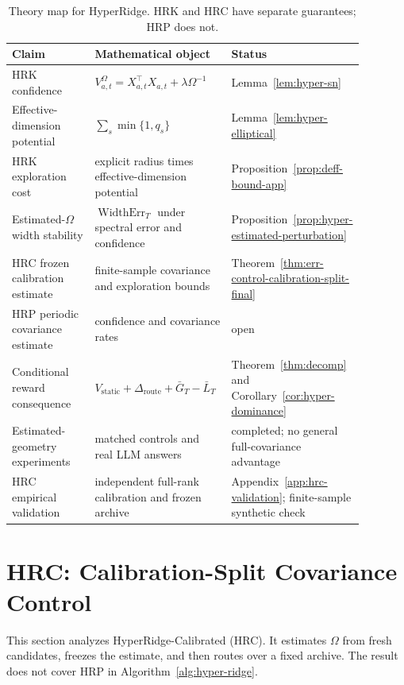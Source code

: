 \documentclass{article} %
\begin{document}
\begin{table}[h]
\centering
\small
\caption{Theory map for HyperRidge. HRK and HRC have separate guarantees;
HRP does not.}
\label{tab:hyper-theory-map}
\begin{tabular}{
p{0.24\linewidth}
p{0.39\linewidth}
p{0.25\linewidth}}
\toprule
Claim & Mathematical object & Status \\
\midrule
HRK confidence & \(V_{a,t}^{\Omega}=X_{a,t}^{\top}X_{a,t}+\lambda\Omega^{-1}\) & Lemma~\ref{lem:hyper-sn} \\
Effective-dimension potential & \(\sum_s \min\{1,q_s\}\) & Lemma~\ref{lem:hyper-elliptical} \\
HRK exploration cost & explicit radius times effective-dimension potential & Proposition~\ref{prop:deff-bound-app} \\
Estimated-\(\Omega\) width stability & \(\operatorname{WidthErr}_T\) under spectral error and confidence & Proposition~\ref{prop:hyper-estimated-perturbation} \\
HRC frozen calibration estimate & finite-sample covariance and exploration bounds & Theorem~\ref{thm:err-control-calibration-split-final} \\
HRP periodic covariance estimate & confidence and covariance rates & open \\
Conditional reward consequence & \(V_{\mathrm{static}}+\Delta_{\mathrm{route}}+\bar G_T-\bar L_T\) & Theorem~\ref{thm:decomp} and Corollary~\ref{cor:hyper-dominance} \\
Estimated-geometry experiments & matched controls and real LLM answers & completed; no general full-covariance advantage \\
HRC empirical validation & independent full-rank calibration and frozen archive & Appendix~\ref{app:hrc-validation}; finite-sample synthetic check \\
\bottomrule
\end{tabular}

\end{table}

\section{HRC: Calibration-Split Covariance Control}
\label{app:err-control-proof}

This section analyzes HyperRidge-Calibrated (HRC). It estimates
\(\Omega\) from fresh candidates, freezes the estimate, and then routes over a
fixed archive. The result does not cover HRP in
Algorithm~\ref{alg:hyper-ridge}.
\end{document}
